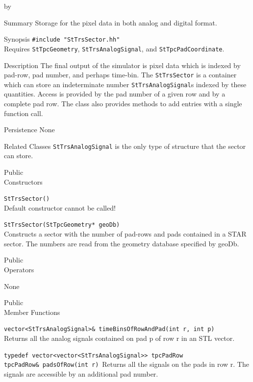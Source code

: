 \documentclass[twoside]{article}
\newcommand{\comp}[1]{\texttt{#1}}%
\newcommand{\entrylabel}[1]{\mbox{\textbf{{#1}}}\hfil}%
\newenvironment{entry}
{\begin{list}{}%
    {\renewcommand{\makelabel}{\entrylabel}%
     \setlength{\labelwidth}{90pt}%
     \setlength{\leftmargin}{\labelwidth}
     \advance\leftmargin by \labelsep%
      }%
    }%
  {\end{list}}
\newcommand{\Entrylabel}[1]%
{\raisebox{0pt}[1ex][0pt]{\makebox[\labelwidth][l]%
    {\parbox[t]{\labelwidth}{\hspace{0pt}\textbf{{#1}}}}}}
\newenvironment{Entry}%
{\renewcommand{\entrylabel}{\Entrylabel}\begin{entry}}%
  {\end{entry}}
\begin{document}
\begin{Entry}
\item[Summary]
  Storage for the pixel data in both analog and digital format.


\item[Synopsis]
  \verb+#include "StTrsSector.hh"+\\
  Requires \comp{StTpcGeometry}, \comp{StTrsAnalogSignal}, and
  \comp{StTpcPadCoordinate}.

\item[Description]
  The final output of the simulator is pixel data which is indexed
  by pad-row, pad number, and perhaps time-bin.  The \comp{StTrsSector} is
  a container which can store an indeterminate number \comp{StTrsAnalogSignal}s
  indexed by these quantities.  Access is provided by the pad number of
  a given row and by a complete pad row.  The class also provides methods to
  add entries with a single function call.

\item[Persistence]
   None

\item[Related Classes]
  \comp{StTrsAnalogSignal} is the only type of structure that the
  sector can store.

\item[Public \\ Constructors]

  \verb+StTrsSector()+\\
  Default constructor cannot be called!

  \verb+StTrsSector(StTpcGeometry* geoDb)+\\
  Constructs a sector with the number of pad-rows and pads contained
  in a STAR sector.  The numbers are read from the geometry database
  specified by geoDb.

\item[Public \\ Operators]

  None

\item[Public \\ Member Functions]

  \verb+vector<StTrsAnalogSignal>& timeBinsOfRowAndPad(int r, int p)+\\
  Returns all the analog signals contained on pad p of row r in
  an STL vector.

  \verb+typedef vector<vector<StTrsAnalogSignal>> tpcPadRow+\\
  \verb+tpcPadRow& padsOfRow(int r)+\
  Returns all the signals on the pads in row r.  The signals are
  accessible by an additional pad number.


\end{Entry}
\end{document}
